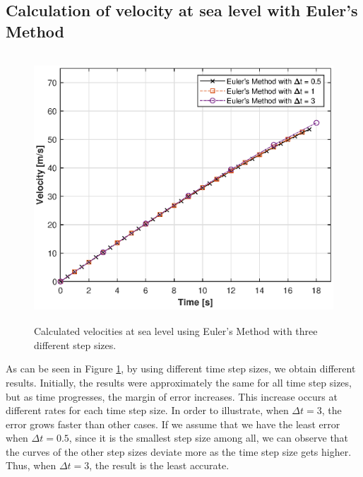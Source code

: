 \documentclass[letterpaper,12pt]{article}
\begin{document}
\subsection{Calculation of velocity at sea level with Euler's Method }
\begin{figure}[ht]
\centering \includegraphics[max height=10cm]{graphs/question1.eps}
\caption{Calculated velocities at sea level using Euler's Method with three different step sizes.}
     \label{fig:q1}
\end{figure}

As can be seen in Figure \ref{fig:q1}, by using different time step sizes, we obtain different results.
Initially, the results were approximately the same for all time step sizes, but as time progresses, the margin of error increases.
This increase occurs at different rates for each time step size. In order to illustrate, when $ \Delta t = 3 $, the
error grows faster than other cases. If we assume that we have the least error when $ \Delta t = 0.5 $, since it is
the smallest step size among all, we can observe that the curves of the other step sizes deviate more as the time step size gets
higher. Thus, when $ \Delta t = 3 $, the result is the least accurate.
\end{document}
